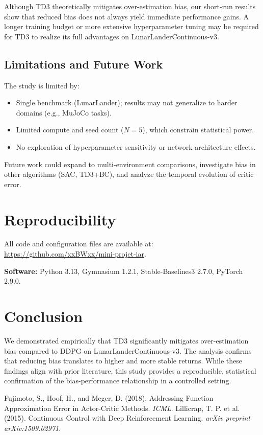 \documentclass[10pt,letterpaper]{article}
\begin{document}
Although TD3 theoretically mitigates over-estimation bias, our short-run results show that reduced bias does not always yield immediate performance gains. A longer training budget or more extensive hyperparameter tuning may be required for TD3 to realize its full advantages on LunarLanderContinuous-v3.


\subsection{Limitations and Future Work}
The study is limited by:
\begin{itemize}
  \item Single benchmark (LunarLander); results may not generalize to harder domains (e.g., MuJoCo tasks).
  \item Limited compute and seed count ($N=5$), which constrain statistical power.
  \item No exploration of hyperparameter sensitivity or network architecture effects.
\end{itemize}
Future work could expand to multi-environment comparisons, investigate bias in other algorithms (SAC, TD3+BC), and analyze the temporal evolution of critic error.

\section{Reproducibility}
All code and configuration files are available at:
\url{https://github.com/xxBWxx/mini-projet-iar}.

\noindent
\textbf{Software:} Python 3.13, Gymnasium 1.2.1, Stable-Baselines3 2.7.0, PyTorch 2.9.0. 

\section{Conclusion}
We demonstrated empirically that TD3 significantly mitigates over-estimation bias compared to DDPG on LunarLanderContinuous-v3. The analysis confirms that reducing bias translates to higher and more stable returns. While these findings align with prior literature, this study provides a reproducible, statistical confirmation of the bias-performance relationship in a controlled setting.


\begin{thebibliography}{9}
 Fujimoto, S., Hoof, H., and Meger, D. (2018). Addressing Function Approximation Error in Actor-Critic Methods. \textit{ICML}.
 Lillicrap, T. P. et al. (2015). Continuous Control with Deep Reinforcement Learning. \textit{arXiv preprint arXiv:1509.02971}.
\end{thebibliography}
\end{document}
